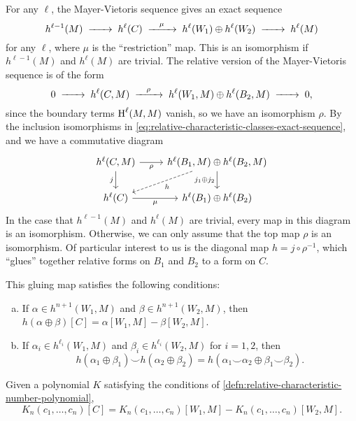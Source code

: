For any $\ell$, the Mayer-Vietoris sequence gives an exact sequence
\[
	h^{\ell-1}(M)\lkxto h^{\ell}(C) \lkxto[\mu] h^{\ell}(W_1)\oplus h^{\ell}(W_2) \lkxto h^{\ell}(M)
\]
for any $\ell$, where $\mu$ is the ``restriction'' map. This is an isomorphism if $h^{\ell-1}(M)$ and $h^\ell(M)$ are trivial.
The relative version of the Mayer-Vietoris sequence is of the form
\[
	0 \lkxto h^{\ell}(C, M) \lkxto[\rho] h^{\ell}(W_1,M)\oplus h^{\ell}(B_2,M) \lkxto 0,
\]
since the boundary terms $\operatorname{H}^\ell(M,M)$ vanish, so we have an isomorphism $\rho$.
By the inclusion isomorphisms in \cref{eq:relative-characteristic-classes-exact-sequence}, and we have a commutative diagram
\[
	\begin{tikzcd}
		{h^{\ell}(C,M)} & {h^{\ell}(B_1,M)\oplus h^{\ell}(B_2,M)} \\
		{h^{\ell}(C)} & {h^{\ell}(B_1)\oplus h^{\ell}(B_2)}
		\arrow["j_1\oplus j_2"', from=1-2, to=2-2]
		\arrow["\rho"', from=1-1, to=1-2]
		\arrow["j"', from=1-1, to=2-1]
		\arrow["\mu"', from=2-1, to=2-2]
		\arrow["h", from=1-2, to=2-1, dashed]
	\end{tikzcd}
\]
In the case that $h^{\ell-1}(M)$ and $h^\ell(M)$ are trivial, every map in this diagram is an isomorphism. Otherwise, we can only assume that the top map $\rho$ is an isomorphism.
Of particular interest to us is the diagonal map $h = j\circ \rho^{-1}$, which ``glues'' together relative forms on $B_1$ and $B_2$ to a form on $C$. 

\begin{proposition}\label{prop:invariant-variation-naturality}
	This gluing map satisfies the following conditions:
	\begin{enumerate}[(a)]
		\item If $\alpha\in h^{n+1}(W_1, M)$ and $\beta\in h^{n+1}(W_2,M)$, then
		      $h(\alpha\oplus \beta)[C] = \alpha[W_1, M] - \beta[W_2, M]$.
		\item If $\alpha_i\in h^{\ell_i}(W_1,M)$ and $\beta_i \in h^{\ell_i}(W_2,M)$ for $i=1,2$, then
		      \[h(\alpha_1\oplus\beta_1) \smile h(\alpha_2\oplus \beta_2) = h(\alpha_1\smile \alpha_2 \oplus \beta_1\smile \beta_2).\]
	\end{enumerate}
\end{proposition}

\begin{corollary}\label{prop:relative-characteristic-number-variation}
	Given a polynomial $K$ satisfying the conditions of \cref{defn:relative-characteristic-number-polynomial},
	\[
		K_n(c_1,\ldots, c_n)[C] = K_n(c_1,\ldots, c_n)[W_1, M] - K_n(c_1,\ldots, c_n)[W_2, M].
	\]
\end{corollary}

